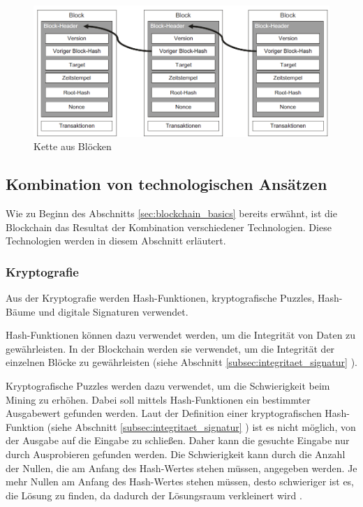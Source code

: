 \begin{figure}[H]
    \centering
    \includegraphics[width=0.9\linewidth]{images/chain_of_blocks.png}
    \caption{Kette aus Blöcken \parencite[S. 12]{Fill_BlockchainGrundlagen}}
    \label{fig:chain_of_blocks}
\end{figure}


\subsection{Kombination von technologischen Ansätzen}
\label{subsec:cryptography_basics}

Wie zu Beginn des Abschnitts \ref{sec:blockchain_basics} \textit{} bereits erwähnt, ist die Blockchain das Resultat der Kombination verschiedener Technologien. Diese Technologien werden in diesem Abschnitt erläutert.


\subsubsection{Kryptografie}

Aus der Kryptografie werden Hash-Funktionen, kryptografische Puzzles, Hash-Bäume und digitale Signaturen verwendet. 

Hash-Funktionen können dazu verwendet werden, um die Integrität von Daten zu gewährleisten. In der Blockchain werden sie verwendet, um die Integrität der einzelnen Blöcke zu gewährleisten (siehe Abschnitt \ref{subsec:integritaet_signatur} \textit{}).

Kryptografische Puzzles werden dazu verwendet, um die Schwierigkeit beim Mining zu erhöhen. Dabei soll mittels Hash-Funktionen ein bestimmter Ausgabewert gefunden werden. Laut der Definition einer kryptografischen Hash-Funktion (siehe Abschnitt \ref{subsec:integritaet_signatur} \textit{}) ist es nicht möglich, von der Ausgabe auf die Eingabe zu schließen. Daher kann die gesuchte Eingabe nur durch Ausprobieren gefunden werden. Die Schwierigkeit kann durch die Anzahl der Nullen, die am Anfang des Hash-Wertes stehen müssen, angegeben werden. Je mehr Nullen am Anfang des Hash-Wertes stehen müssen, desto schwieriger ist es, die Lösung zu finden, da dadurch der Lösungsraum verkleinert wird \parencites[S. 6-7]{Fill_BlockchainGrundlagen}[S. 320]{Antonopoulos_MasteringEthereum}.

